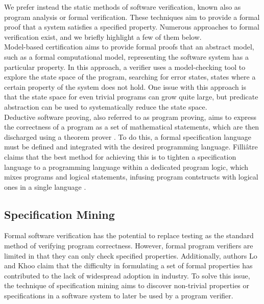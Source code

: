 \documentclass[12pt]{article}
\begin{document}
\noindent We prefer instead the static methods of software verification, known
also as program analysis or formal verification. These techniques aim to
provide a formal proof that a system satisfies a specified property. Numerous
approaches to formal verification exist, and we briefly highlight a few of
them below.
\\

\noindent Model-based certification aims to provide formal proofs that an
abstract model, such as a formal computational model, representing the software
system has a particular property\cite{FormalSoftwareVerification}. In this
approach, a verifier uses a model-checking tool to explore the state space of
the program, searching for error states, states where a certain property of the
system does not hold. One issue with this approach is that the state space for
even trivial programs can grow quite large, but predicate abstraction can be 
used to systematically reduce the state space\cite{FormalSoftwareVerification}.
\\

\noindent Deductive software proving, also referred to as program proving, aims
to express the correctness of a program as a set of mathematical statements,
which are then discharged using a theorem prover
\cite{DeductiveSoftwareVerification}. To do this, a formal specification
language must be defined and integrated with the desired programming language.
Filliâtre claims that the best method for achieving this is to tighten a
specification language to a programming language within a dedicated program
logic, which mixes programs and logical statements, infusing program
contstructs with logical ones in a single language
\cite{DeductiveSoftwareVerification}.

\subsection{Specification Mining}
Formal software verification has the potential to replace testing as the
standard method of verifying program correctness. However, formal program
verifiers are limited in that they can only check specified properties.
Additionally, authors Lo and Khoo claim that the difficulty in formulating a
set of formal properties has contributed to the lack of widespread adoption in
industry\cite{Lo_softwarespecification}. To solve this issue, the technique of
specification mining aims to discover non-trivial properties or specifications
in a software system to later be used by a program verifier.
\\
\end{document}
